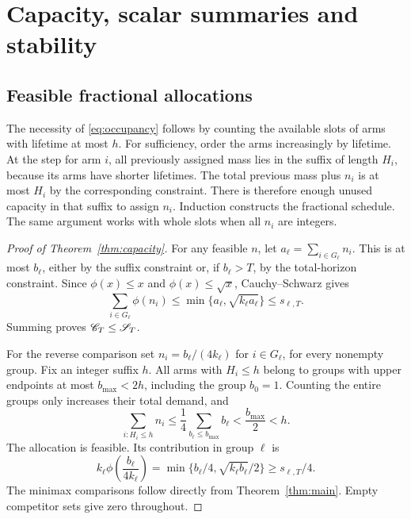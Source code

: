\section{Capacity, scalar summaries and stability}
\subsection{Feasible fractional allocations}
The necessity of \eqref{eq:occupancy} follows by counting the available slots of arms with lifetime at most $h$. For sufficiency, order the arms increasingly by lifetime. At the step for arm $i$, all previously assigned mass lies in the suffix of length $H_i$, because its arms have shorter lifetimes. The total previous mass plus $n_i$ is at most $H_i$ by the corresponding constraint. There is therefore enough unused capacity in that suffix to assign $n_i$. Induction constructs the fractional schedule. The same argument works with whole slots when all $n_i$ are integers.

\begin{proof}[Proof of Theorem~\ref{thm:capacity}]
For any feasible $n$, let $a_\ell=\sum_{i\in G_\ell}n_i$. This is at most $b_\ell$, either by the suffix constraint or, if $b_\ell>T$, by the total-horizon constraint. Since $\phi(x)\le x$ and $\phi(x)\le\sqrt x$, Cauchy--Schwarz gives
\[
 \sum_{i\in G_\ell}\phi(n_i)
 \le\min\{a_\ell,\sqrt{k_\ell a_\ell}\}\le s_{\ell,T}.
\]
Summing proves $\mathscr C_T\le\mathscr S_T$.

For the reverse comparison set $n_i=b_\ell/(4k_\ell)$ for $i\in G_\ell$, for every nonempty group. Fix an integer suffix $h$. All arms with $H_i\le h$ belong to groups with upper endpoints at most $b_{\max}<2h$, including the group $b_0=1$. Counting the entire groups only increases their total demand, and
\[
 \sum_{i:H_i\le h}n_i\le\frac14\sum_{b_\ell\le b_{\max}}b_\ell
 <\frac{b_{\max}}2<h.
\]
The allocation is feasible. Its contribution in group $\ell$ is
\[
 k_\ell\phi\left(\frac{b_\ell}{4k_\ell}\right)
 =\min\{b_\ell/4,\sqrt{k_\ell b_\ell}/2\}\ge s_{\ell,T}/4.
\]
The minimax comparisons follow directly from Theorem~\ref{thm:main}. Empty competitor sets give zero throughout.
\end{proof}

